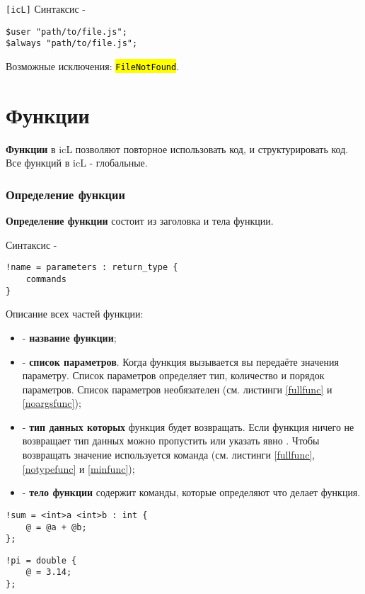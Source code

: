 \documentclass[a4paper, 14pt]{extarticle}
\newcommand{\ferror}[1]{\foreignlanguage{english}{\fontsize{11pt}{12pt}\tt{\sethlcolor{yellow}\hl{#1}}}}
\newenvironment{icItems}
	{ \begin{itemize} [noitemsep,nolistsep] }
	{ \end{itemize} }
\begin{document}
\lstinline|[icL]| Синтаксис -
\begin{lstlisting}[numbers=none]
$user "path/to/file.js";
$always "path/to/file.js";
\end{lstlisting}

Возможные исключения: \ferror{FileNotFound}.

\section{Функции}

{\bf Функции} в icL позволяют повторное использовать код, и структурировать код. Все функций в icL - глобальные.

\subsubsection{Определение функции}

{\bf Определение функции} состоит из заголовка и тела функции.

\noindent Синтаксис -
\begin{lstlisting}[numbers=none]
!name = parameters : return_type {
	commands
}
\end{lstlisting}

Описание всех частей функции:
\begin{icItems}
\item
	 - {\bf название функции};
\item
	 - {\bf список параметров}. Когда функция вызывается вы передаёте значения параметру. Список параметров определяет тип, количество и порядок параметров. Список параметров необязателен (см. листинги \ref{fullfunc} и \ref{noargsfunc});
\item
	 - {\bf тип данных которых} функция будет возвращать. Если функция ничего не возвращает тип данных можно пропустить или указать явно \void{}. Чтобы возвращать значение используется команда  (см. листинги \ref{fullfunc}, \ref{notypefunc} и \ref{minfunc});
\item
	 - {\bf тело функции} содержит команды, которые определяют что делает функция.
\end{icItems}

\begin{lstlisting}[caption=Полноценная функция, label=fullfunc]
!sum = <int>a <int>b : int {
	@ = @a + @b;
};
\end{lstlisting}

\begin{lstlisting}[caption=Функция без аргументов, label=noargsfunc]
!pi = double {
	@ = 3.14;
};
\end{lstlisting}
\end{document}
